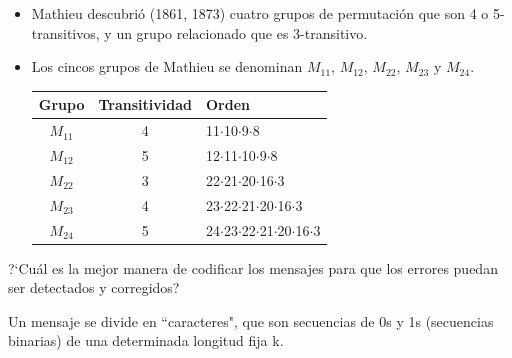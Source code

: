 \documentclass{article}
\numberwithin{equation}{section}
\theoremstyle{plain}  %
\begin{document}
\begin{itemize}
    \item<1-> Mathieu descubrió (1861, 1873) cuatro grupos de permutación que son 4 o 5-transitivos, y un grupo relacionado que es 3-transitivo.\newline
    
    \item<2-> Los cincos grupos de Mathieu se denominan $M_{11}$, $M_{12}$, $M_{22}$, $M_{23}$ y $M_{24}$.\newline

    \begin{tabular}{|c|c|l|}
       \hline
       Grupo & Transitividad & Orden    \\ \hline
       $M_{11}$ & 4 & 11$\cdot$10$\cdot$9$\cdot$8   \\ 
       $M_{12}$ & 5 & 12$\cdot$11$\cdot$10$\cdot$9$\cdot$8     \\ 
       $M_{22}$ & 3 & 22$\cdot$21$\cdot$20$\cdot$16$\cdot$3     \\ 
       $M_{23}$ & 4 & 23$\cdot$22$\cdot$21$\cdot$20$\cdot$16$\cdot$3     \\ 
       $M_{24}$ & 5 & 24$\cdot$23$\cdot$22$\cdot$21$\cdot$20$\cdot$16$\cdot$3     \\   \hline
    \end{tabular}

\end{itemize}
?`Cuál es la mejor manera de codificar los mensajes para que los errores puedan ser detectados y corregidos?\newline

Un mensaje se divide en ``caracteres", que son secuencias de 0s y 1s (secuencias binarias) de una determinada longitud fija k.\newline
\end{document}
